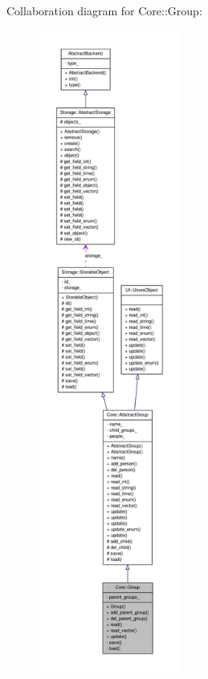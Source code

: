 Collaboration diagram for Core::Group:
\nopagebreak
\begin{figure}[H]
\begin{center}
\leavevmode
\includegraphics[height=600pt]{d7/da7/classCore_1_1Group__coll__graph}
\end{center}
\end{figure}
